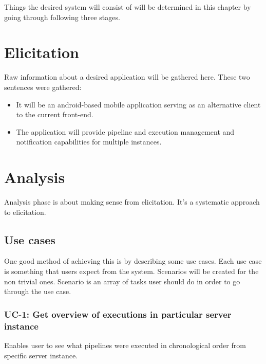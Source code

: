 Things the desired system will consist of will be determined in this chapter by going through following three stages.


\section{Elicitation}
Raw information about a desired application will be gathered here.
These two sentences were gathered:
\begin{itemize}
    \item It will be an android-based mobile application serving as an alternative client to the current \etl{} front-end.
    \item The application will provide pipeline and execution management and notification capabilities for multiple \etl{} instances.
\end{itemize}

\section{Analysis}
Analysis phase is about making sense from elicitation.
It's a systematic approach to elicitation.


\subsection{Use cases}
One good method of achieving this is by describing some use cases.
Each use case is something that users expect from the system.
Scenarios will be created for the non trivial ones.
Scenario is an array of tasks user should do in order to go through the use case.

\subsubsection*{UC-1: Get overview of executions in particular server instance}
Enables user to see what pipelines were executed in chronological order from specific server instance.
